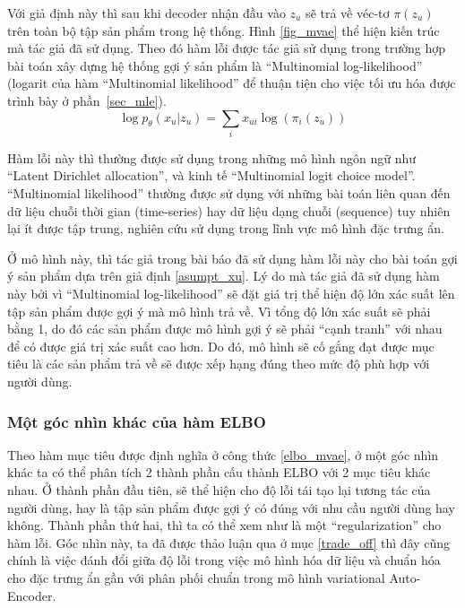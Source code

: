     
    Với giả định này thì sau khi decoder nhận đầu vào $z_u$ sẽ trả về véc-tơ $\pi(z_u)$ trên toàn bộ tập sản phẩm trong hệ thống. 
    Hình \ref{fig_mvae} thể hiện kiến trúc mà tác giả đã sử dụng. 
    Theo đó hàm lỗi được tác giả sử dụng trong trường hợp bài toán xây dựng hệ thống gợi ý sản phẩm là ``Multinomial log-likelihood'' (logarit của hàm ``Multinomial likelihood'' để thuận tiện cho việc tối ưu hóa được trình bày ở phần~\ref{sec_mle}).
    \begin{equation}
        \log p_\theta(x_u|z_u) = \sum_i x_{ui}\log (\pi_i(z_u))
    \end{equation}

    Hàm lỗi này thì thường được sử dụng trong những mô hình ngôn ngữ như ``Latent Dirichlet allocation'', và kinh tế ``Multinomial logit choice model''. 
    ``Multinomial likelihood'' thường được sử dụng với những bài toán liên quan đến dữ liệu chuỗi thời gian (time-series) hay dữ liệu dạng chuỗi (sequence) tuy nhiên lại ít được tập trung, nghiên cứu sử dụng trong lĩnh vực mô hình đặc trưng ẩn. 

    Ở mô hình này, thì tác giả trong bài báo \cite{mvae} đã sử dụng hàm lỗi này cho bài toán gợi ý sản phẩm dựa trên giả định \ref{asumpt_xu}.
    Lý do mà tác giả đã sử dụng hàm này bởi vì 
    ``Multinomial log-likelihood'' sẽ đặt giá trị thể hiện độ lớn xác suất lên tập sản phẩm được gợi ý mà mô hình trả về. 
    Vì tổng độ lớn xác suất sẽ phải bằng 1, do đó các sản phẩm được mô hình gợi ý sẽ phải ``cạnh tranh'' với nhau để có được giá trị xác suất cao hơn. 
    Do đó, mô hình sẽ cố gắng đạt được mục tiêu là các sản phẩm trả về sẽ được xếp hạng đúng theo mức độ phù hợp với người dùng. 
    
    \subsubsection{Một góc nhìn khác của hàm ELBO}
    \label{subsubsecELBO}
    Theo hàm mục tiêu được định nghĩa ở công thức \ref{elbo_mvae}, ở một góc nhìn khác ta có thể phân tích 2 thành phần cấu thành ELBO với 2 mục tiêu khác nhau.
    Ở thành phần đầu tiên, sẽ thể hiện cho độ lỗi tái tạo lại tương tác của người dùng, hay là tập sản phẩm được gợi ý có đúng với nhu cầu người dùng hay không. 
    Thành phần thứ hai, thì ta có thể xem như là một ``regularization'' cho hàm lỗi.
    Góc nhìn này, ta đã được thảo luận qua ở mục \ref{trade_off} thì đây cũng chính là việc đánh đổi giữa độ lỗi trong việc mô hình hóa dữ liệu và chuẩn hóa cho đặc trưng ẩn gần với phân phối chuẩn trong mô hình variational Auto-Encoder.

